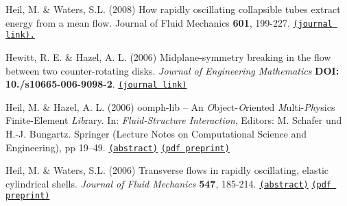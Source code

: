\begin{DoxyItemize}
\item Heil, M. \& Waters, S.\-L. (2008) How rapidly oscillating collapsible tubes extract energy from a mean flow. Journal of Fluid Mechanics {\bfseries 601}, 199-\/227. \href{http://journals.cambridge.org/action/displayFulltext?type=1&fid=1846472&jid=FLM&volumeId=601&issueId=-1&aid=1846464}{\tt (journal link).}
\end{DoxyItemize}


\begin{DoxyItemize}
\item Hewitt, R. E. \& Hazel, A. L. (2006) Midplane-\/symmetry breaking in the flow between two counter-\/rotating disks. {\itshape Journal of Engineering Mathematics} {\bfseries D\-O\-I\-: 10./s10665-\/006-\/9098-\/2}. \href{http://www.springerlink.com/content/8930128433612244/}{\tt (journal link)}
\end{DoxyItemize}


\begin{DoxyItemize}
\item Heil, M. \& Hazel, A. L. (2006) {\ttfamily oomph-\/lib} -- An {\itshape O}bject-\/{\itshape O}riented {\itshape M}ulti-\/{\itshape Ph}ysics Finite-\/\-Element {\itshape Lib}rary. In\-: {\itshape Fluid-\/\-Structure Interaction}, Editors\-: M. Schafer und H.-\/\-J. Bungartz. Springer (Lecture Notes on Computational Science and Engineering), pp 19--49. \href{http://www.maths.man.ac.uk/~mheil/MATTHIAS/ABSTRACTS/HeilHazelOomph2006.html}{\tt (abstract)} \href{http://www.maths.man.ac.uk/~mheil/MATTHIAS/PDF/oomph_for_www.pdf}{\tt (pdf preprint)}
\end{DoxyItemize}


\begin{DoxyItemize}
\item Heil, M. \& Waters, S.\-L. (2006) Transverse flows in rapidly oscillating, elastic cylindrical shells. {\itshape Journal of Fluid Mechanics} {\bfseries 547}, 185-\/214. \href{http://www.maths.man.ac.uk/~mheil/MATTHIAS/ABSTRACTS/HeilWaters2004.html}{\tt (abstract)} \href{http://www.maths.man.ac.uk/~mheil/MATTHIAS/PDF/OscRing_final_version_for_WWW.pdf}{\tt (pdf preprint)} \par
\par

\end{DoxyItemize}


